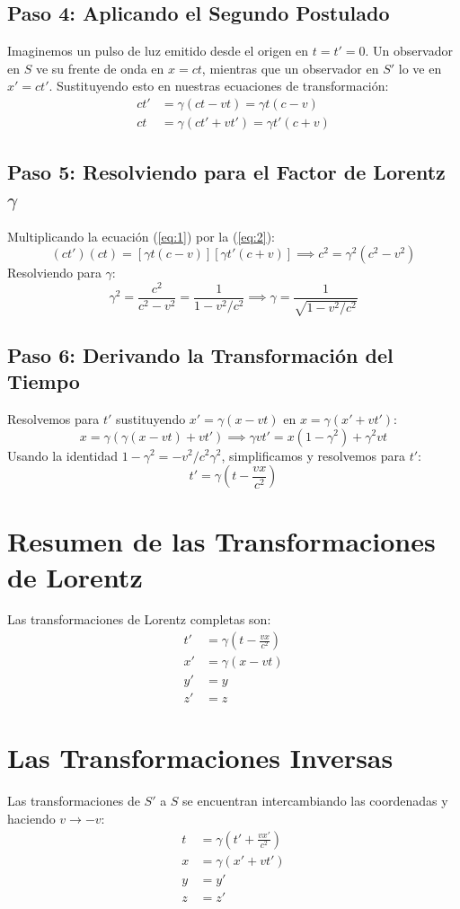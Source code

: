 \documentclass[11pt,a4paper]{article}
\begin{document}
\subsection{Paso 4: Aplicando el Segundo Postulado}
Imaginemos un pulso de luz emitido desde el origen en $t=t'=0$. Un observador en $S$ ve su frente de onda en $x=ct$, mientras que un observador en $S'$ lo ve en $x'=ct'$. Sustituyendo esto en nuestras ecuaciones de transformación:
\begin{align}
ct' &= \gamma(ct - vt) = \gamma t (c-v) \label{eq:1} \\
ct &= \gamma(ct' + vt') = \gamma t' (c+v) \label{eq:2}
\end{align}

\subsection{Paso 5: Resolviendo para el Factor de Lorentz \texorpdfstring{$\gamma$}{gamma}}
Multiplicando la ecuación (\ref{eq:1}) por la (\ref{eq:2}):
\[ (ct')(ct) = [\gamma t (c-v)][\gamma t' (c+v)] \implies c^2 = \gamma^2 (c^2 - v^2) \]
Resolviendo para $\gamma$:
\[ \gamma^2 = \frac{c^2}{c^2 - v^2} = \frac{1}{1 - v^2/c^2} \implies \boxed{\gamma = \frac{1}{\sqrt{1 - v^2/c^2}}} \]

\subsection{Paso 6: Derivando la Transformación del Tiempo}
Resolvemos para $t'$ sustituyendo $x'=\gamma(x-vt)$ en $x = \gamma(x' + vt')$:
\[ x = \gamma(\gamma(x-vt) + vt') \implies \gamma v t' = x(1-\gamma^2) + \gamma^2 v t \]
Usando la identidad $1-\gamma^2 = -v^2/c^2 \gamma^2$, simplificamos y resolvemos para $t'$:
\[ \boxed{t' = \gamma \left( t - \frac{vx}{c^2} \right)} \]

\section{Resumen de las Transformaciones de Lorentz}
Las transformaciones de Lorentz completas son:
\[
\boxed{
\begin{aligned}
t' &= \gamma \left( t - \frac{vx}{c^2} \right) \\
x' &= \gamma (x - vt) \\
y' &= y \\
z' &= z
\end{aligned}
}
\]

\section{Las Transformaciones Inversas}
Las transformaciones de $S'$ a $S$ se encuentran intercambiando las coordenadas y haciendo $v \to -v$:
\[
\boxed{
\begin{aligned}
t &= \gamma \left( t' + \frac{vx'}{c^2} \right) \\
x &= \gamma (x' + vt') \\
y &= y' \\
z &= z'
\end{aligned}
}
\]
\end{document}
